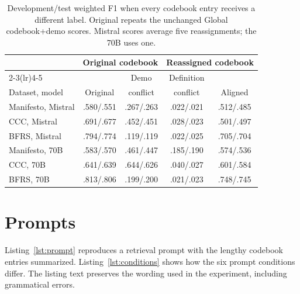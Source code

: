 \documentclass[11pt]{article}
\begin{document}
\begin{table}[!t]
\centering
\begin{tabular}{lcccc}
\toprule
 & \multicolumn{2}{c}{Original codebook} & \multicolumn{2}{c}{Reassigned codebook} \\
\cmidrule(lr){2-3}\cmidrule(lr){4-5}
 & & Demo & Definition & \\
Dataset, model & Original & conflict & conflict & Aligned \\
\midrule
Manifesto, Mistral & .580/.551 & .267/.263 & .022/.021 & .512/.485 \\
CCC, Mistral & .691/.677 & .452/.451 & .028/.023 & .501/.497 \\
BFRS, Mistral & .794/.774 & .119/.119 & .022/.025 & .705/.704 \\
Manifesto, 70B & .583/.570 & .461/.447 & .185/.190 & .574/.536 \\
CCC, 70B & .641/.639 & .644/.626 & .040/.027 & .601/.584 \\
BFRS, 70B & .813/.806 & .199/.200 & .021/.023 & .748/.745 \\
\bottomrule
\end{tabular}
\caption{Development/test weighted F1 when every codebook entry receives a different label. Original repeats the unchanged Global codebook+demo scores. Mistral scores average five reassignments; the 70B uses one.}
\label{tab:all-reassigned}
\end{table}

\clearpage
\section{Prompts}
\label{app:prompts}

Listing~\ref{lst:prompt} reproduces a retrieval prompt with the lengthy codebook entries summarized. Listing~\ref{lst:conditions} shows how the six prompt conditions differ. The listing text preserves the wording used in the experiment, including grammatical errors.
\end{document}
